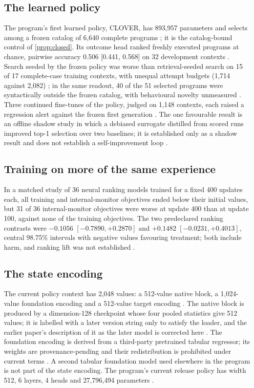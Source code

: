 \subsection{The learned policy}

The program's first learned policy, CLOVER, has 893,957 parameters and selects among a frozen catalog
of 6,640 complete programs \est{}; it is the catalog-bound control of \cref{prop:closed}. Its
outcome head ranked freshly executed programs at chance, pairwise accuracy 0.506 [0.441, 0.568] on 32
development contexts \pre. Search seeded by the frozen policy was worse than retrieval-seeded search
on 15 of 17 complete-case training contexts, with unequal attempt budgets (1,714 against 2,082)
\pre; in the same readout, 40 of the 51 selected programs were syntactically outside the frozen
catalog, with behavioural novelty unmeasured \pre. Three continued fine-tunes of the policy, judged on 1,148
contexts, each raised a regression alert against the frozen first generation \pre. The one
favourable result is an offline shadow study in which a debiased surrogate distilled from scored runs
improved top-1 selection over two baselines; it is established only as a shadow result and does not
establish a self-improvement loop \pre.

\subsection{Training on more of the same experience}

In a matched study of 36 neural ranking models trained for a fixed 400 updates each, all training
and internal-monitor objectives ended below their initial values, but 31 of 36 internal-monitor
objectives were worse at update 400 than at update 100, against none of the training objectives.
The two predeclared ranking contrasts were $-0.1056$ $[-0.7890, +0.2870]$ and
$+0.1482$ $[-0.0231, +0.4013]$, central 98.75\% intervals with negative values favouring treatment;
both include harm, and ranking lift was not established \pre{} \citep{jopedime2026h27}.

\subsection{The state encoding}

The current policy context has 2,048 values: a 512-value native block, a 1,024-value foundation
encoding and a 512-value target encoding \est. The native block is produced by a dimension-128
checkpoint whose four pooled statistics give 512 values; it is labelled with a later version string
only to satisfy the loader, and the earlier paper's description of it as the later model is
corrected here \est. The foundation encoding is derived from a third-party pretrained tabular
regressor; its weights are provenance-pending and their redistribution is prohibited under current
terms \est. A second tabular foundation model used elsewhere in the program is not part of the state
encoding. The program's current release policy has width 512, 6 layers, 4 heads and 27,796,494
parameters \est.

